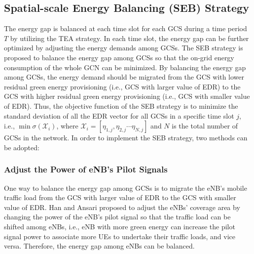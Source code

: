 \documentclass[journal,12pt,draftclsnofoot,onecolumn]{IEEEtran}
\begin{document}
\subsection{Spatial-scale Energy Balancing (SEB) Strategy}
The energy gap is balanced at each time slot for each GCS during a time period $T$ by utilizing the TEA strategy. In each time slot, the energy gap can be further optimized by adjusting the energy demands among GCSs. The SEB strategy is proposed to balance the energy gap among GCSs so that the on-grid energy consumption of the whole GCN can be minimized. By balancing the energy gap among GCSs, the energy demand should be migrated from the GCS with lower residual green energy provisioning (i.e., GCS with larger value of EDR) to the GCS with higher residual green energy provisioning (i.e., GCS with smaller value of EDR). Thus, the objective function of the SEB strategy is to minimize the standard deviation of all the EDR vector for all GCSs in a specific time slot $j$, i.e., $\min \sigma \left( {{\bm{\mathcal{X}}_i}} \right)$, where ${\bm{\mathcal{X}}_i} = [{\eta _{1,j}},{\eta _{2,j}} \cdots {\eta _{N,j}}]$ and $N$ is the total number of GCSs in the network. In order to implement the SEB strategy, two methods can be adopted: 

\subsubsection{Adjust the Power of eNB's Pilot Signals}
One way to balance the energy gap among GCSs is to migrate the eNB's mobile traffic load from the GCS with larger value of EDR to the GCS with smaller value of EDR. Han and Ansari \cite{11,13} proposed to adjust the eNBs' coverage area by changing the power of the eNB's pilot signal so that the traffic load can be shifted among eNBs, i.e., eNB with more green energy can increase the pilot signal power to associate more UEs to undertake their traffic loads, and vice versa. Therefore, the energy gap among eNBs can be balanced.
\end{document}
